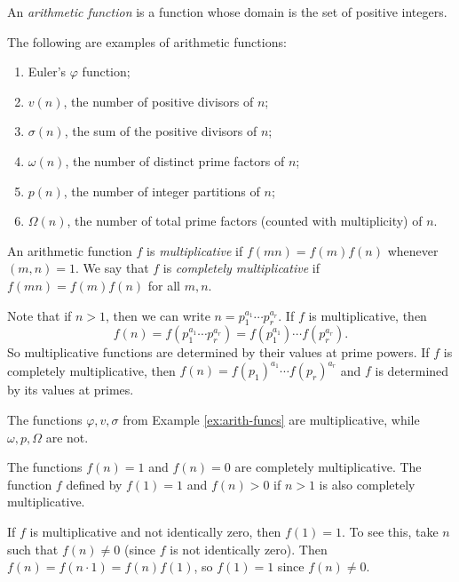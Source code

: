 \begin{definition}
  An \emph{arithmetic function} is a
  function whose domain is the set of
  positive integers.
\end{definition}

\begin{example}\label{ex:arith-funcs}
  The following are examples of
  arithmetic functions:
  \begin{enumerate}
    \item Euler's $\varphi$ function;
    \item $v(n)$, the number of
      positive divisors of $n$;
    \item $\sigma(n)$, the sum of
      the positive divisors of $n$;
    \item $\omega(n)$, the number of
      distinct prime factors of $n$;
    \item $p(n)$, the number of
      integer partitions of $n$;
    \item $\Omega(n)$, the number of
      total prime factors (counted with
      multiplicity) of $n$.
  \end{enumerate}
\end{example}

\begin{definition}
  An arithmetic function
  $f$ is \emph{multiplicative} if
  $f(mn) = f(m) f(n)$ whenever
  $(m, n) = 1$.
  We say that $f$ is \emph{completely multiplicative}
  if $f(mn) = f(m) f(n)$ for all
  $m, n$.
\end{definition}

\begin{remark}
  Note that if $n > 1$, then we can write
  $n = p_1^{a_1} \cdots p_r^{a_r}$.
  If $f$ is multiplicative, then
  \[
    f(n) = f(p_1^{a_1} \cdots p_r^{a_r})
    = f(p_1^{a_1}) \cdots f(p_r^{a_r}).
  \]
  So multiplicative functions are
  determined by their values at
  prime powers. If
  $f$ is completely multiplicative,
  then $f(n) = f(p_1)^{a_1} \cdots f(p_r)^{a_r}$
  and $f$ is determined by its values
  at primes.
\end{remark}

\begin{example}
  The functions $\varphi, v, \sigma$
  from Example \ref{ex:arith-funcs}
  are multiplicative, while
  $\omega, p, \Omega$ are not.
\end{example}

\begin{example}
  The functions $f(n) = 1$ and $f(n) = 0$
  are completely multiplicative. The
  function $f$ defined by
  $f(1) = 1$ and $f(n) > 0$ if $n > 1$
  is also completely multiplicative.
\end{example}

\begin{remark}
  If $f$ is multiplicative and not
  identically zero, then $f(1) = 1$.
  To see this, take $n$ such
  that $f(n) \ne 0$ (since $f$ is not
  identically zero). Then
  $f(n) = f(n \cdot 1) = f(n) f(1)$, so
  $f(1) = 1$ since $f(n) \ne 0$.
\end{remark}
